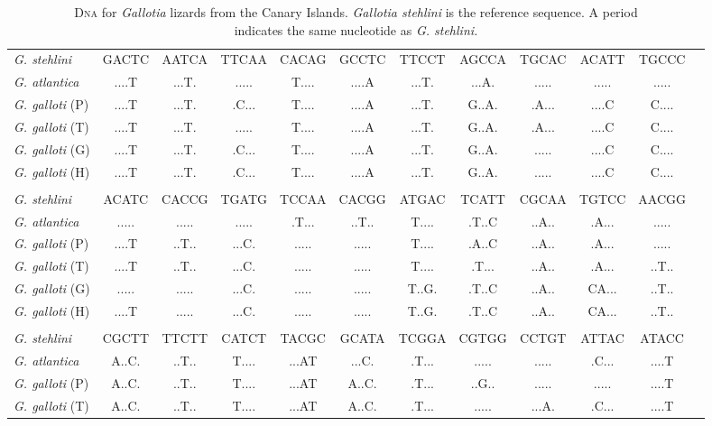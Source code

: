 \documentclass[12pt, hidelinks]{exam}
\begin{document}
\newpage

\begin{landscape}

{\fontsize{11pt}{13pt}\selectfont
\dnatable
\begin{longtable}[l]{lccccccccccc}
\caption{D\textsc{na} for \textit{Gallotia} lizards from the Canary Islands. \textit{Gallotia stehlini} is the reference sequence. A period \\indicates the same nucleotide as \textit{G. stehlini.}\label{tab:dna_results}}\tabularnewline
\toprule
{\regfont\textit{G. stehlini}}	& GACTC & AATCA & TTCAA & CACAG & GCCTC & TTCCT & AGCCA & TGCAC & ACATT & TGCCC \tabularnewline
{\regfont\textit{G. atlantica}}	& ....T & ...T. & ..... & T.... & ....A & ...T. & ...A. & ..... & ..... & ..... \tabularnewline
{\regfont\textit{G. galloti} (P)}	& ....T & ...T. & .C... & T.... & ....A & ...T. & G..A. & .A... & ....C & C.... \tabularnewline
{\regfont\textit{G. galloti} (T)}	& ....T & ...T. & ..... & T.... & ....A & ...T. & G..A. & .A... & ....C & C.... \tabularnewline
{\regfont\textit{G. galloti} (G)}	& ....T & ...T. & .C... & T.... & ....A & ...T. & G..A. & ..... & ....C & C.... \tabularnewline
{\regfont\textit{G. galloti} (H)}	& ....T & ...T. & .C... & T.... & ....A & ...T. & G..A. & ..... & ....C & C.... \tabularnewline%
&&&&&&&&&&\tabularnewline
{\regfont\textit{G. stehlini}}	& ACATC & CACCG & TGATG & TCCAA & CACGG & ATGAC & TCATT & CGCAA & TGTCC & AACGG \tabularnewline
{\regfont\textit{G. atlantica}}	& ..... & ..... & ..... & .T... & ..T.. & T.... & .T..C & ..A.. & .A... & ..... \tabularnewline
{\regfont\textit{G. galloti} (P)}	& ....T & ..T.. & ...C. & ..... & ..... & T.... & .A..C & ..A.. & .A... & ..... \tabularnewline
{\regfont\textit{G. galloti} (T)}	& ....T & ..T.. & ...C. & ..... & ..... & T.... & .T... & ..A.. & .A... & ..T.. \tabularnewline
{\regfont\textit{G. galloti} (G)}	& ..... & ..... & ...C. & ..... & ..... & T..G. & .T..C & ..A.. & CA... & ..T.. \tabularnewline
{\regfont\textit{G. galloti} (H)}	& ....T & ..... & ...C. & ..... & ..... & T..G. & .T..C & ..A.. & CA... & ..T.. \tabularnewline
&&&&&&&&&&\tabularnewline
{\regfont\textit{G. stehlini}}	& CGCTT & TTCTT & CATCT & TACGC & GCATA & TCGGA & CGTGG & CCTGT & ATTAC & ATACC \tabularnewline
{\regfont\textit{G. atlantica}}	& A..C. & ..T.. & T.... & ...AT & ...C. & .T... & ..... & ..... & .C... & ....T \tabularnewline
{\regfont\textit{G. galloti} (P)}	& A..C. & ..T.. & T.... & ...AT & A..C. & .T... & ..G.. & ..... & ..... & ....T \tabularnewline
{\regfont\textit{G. galloti} (T)}	& A..C. & ..T.. & T.... & ...AT & A..C. & .T... & ..... & ...A. & .C... & ....T \tabularnewline

\end{longtable}}
\end{landscape}
\end{document}
